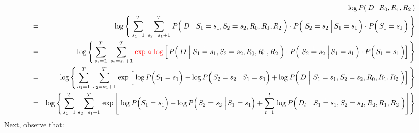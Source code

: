 \begin{eqnarray*}
&&
	\log P\!\left(\,D \;\vert\, R_{0},R_{1},R_{2}\,\right)
\\
&=&
	\log\left\{\,
		\overset{T}{\underset{s_{1}=1}{\sum}}\;\,
		\overset{T}{\underset{s_{2}=s_{1}+1}{\sum}}\;
			P\!\left(\,D\,\left\vert\;S_{1}\overset{{\color{white}1}}{=}s_{1},S_{2}=s_{2},R_{0},R_{1},R_{2}\right.\,\right)
			\cdot
			P\!\left(\,\left.S_{2}\overset{{\color{white}1}}{=}s_{2}\;\right\vert S_{1}=s_{1}\,\right)
			\cdot
			P\!\left(\,S_{1}\overset{{\color{white}1}}{=}s_{1}\,\right)
		\,\right\}
\\
&=&
	\log\left\{\,
		\overset{T}{\underset{s_{1}=1}{\sum}}\;\,
		\overset{T}{\underset{s_{2}=s_{1}+1}{\sum}}\;
		{\color{red}\exp\,\circ\,\log}
		\left[\,
			P\!\left(\,D\,\left\vert\;S_{1}\overset{{\color{white}1}}{=}s_{1},S_{2}=s_{2},R_{0},R_{1},R_{2}\right.\,\right)
			\cdot
			P\!\left(\,\left.S_{2}\overset{{\color{white}1}}{=}s_{2}\;\right\vert S_{1}=s_{1}\,\right)
			\cdot
			P\!\left(\,S_{1}\overset{{\color{white}1}}{=}s_{1}\,\right)
			\right]
		\,\right\}
\\
&=&
	\log\left\{\,
		\overset{T}{\underset{s_{1}=1}{\sum}}\;\,
		\overset{T}{\underset{s_{2}=s_{1}+1}{\sum}}\,
		\exp
		\left[\;
			\log P\!\left(S_{1}\overset{{\color{white}1}}{=}s_{1}\right)
			+
			\log P\!\left(\left.S_{2}\overset{{\color{white}1}}{=}s_{2}\;\right\vert S_{1}=s_{1}\right)
			+
			\log P\!\left(\,D\,\left\vert\;S_{1}\overset{{\color{white}1}}{=}s_{1},S_{2}=s_{2},R_{0},R_{1},R_{2}\right.\,\right)
			\right]
		\,\right\}
\\
&=&
	\log\left\{\,
		\overset{T}{\underset{s_{1}=1}{\sum}}\;
		\overset{T}{\underset{s_{2}=s_{1}+1}{\sum}}\,
		\exp
		\left[\;
			\log P\!\left(S_{1}\overset{{\color{white}1}}{=}s_{1}\right)
			+
			\log P\!\left(\left.S_{2}\overset{{\color{white}1}}{=}s_{2}\;\right\vert S_{1}=s_{1}\right)
			+
			\overset{T}{\underset{t=1}{\sum}}\,
			\log P\!\left(\,D_{t}\,\left\vert\;S_{1}\overset{{\color{white}1}}{=}s_{1},S_{2}=s_{2},R_{0},R_{1},R_{2}\right.\,\right)
			\right]
		\right\}
\end{eqnarray*}
Next, observe that:
